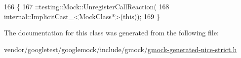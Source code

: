 \begin{DoxyCode}
166                       \{
167     ::testing::Mock::UnregisterCallReaction(
168         internal::ImplicitCast\_<MockClass*>(\textcolor{keyword}{this}));
169   \}
\end{DoxyCode}


The documentation for this class was generated from the following file\+:\begin{DoxyCompactItemize}
\item 
vendor/googletest/googlemock/include/gmock/\hyperlink{gmock-generated-nice-strict_8h}{gmock-\/generated-\/nice-\/strict.\+h}\end{DoxyCompactItemize}
